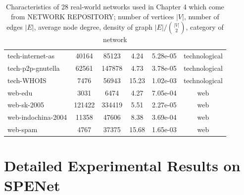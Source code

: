 \documentclass[senior,final,11pt]{iscs-thesis}
\begin{document}
\begin{table}[htb]
\begin{center}
{\begin{tabular}{l | c c c c c}
        tech-internet-as & 40164 & 85123 & 4.24 & 5.28e-05 & technological\\
        tech-p2p-gnutella & 62561 & 147878 & 4.73 & 3.78e-05 & technological\\
        tech-WHOIS & 7476 & 56943 & 15.23 & 1.02e-03 & technological\\
        web-edu & 3031 & 6474 & 4.27 & 7.05e-04 & web\\
        web-sk-2005 & 121422 & 334419 & 5.51 & 2.27e-05 & web\\
        web-indochina-2004 & 11358 & 47606 & 8.38 & 3.69e-04 & web\\
        web-spam & 4767 & 37375 & 15.68 & 1.65e-03 & web\\
      \end{tabular}
      }
      \caption{Characteristics of 28 real-world networks used in Chapter 4 which come from NETWORK REPOSITORY; number of vertices $|V|$, number of edges $|E|$, average node degree, density of graph $|E|/ \binom{|V|}{2}$, category of network}
      \label{tab:data_dos_pdos}
    \end{center}
  \end{table}

\chapter{Detailed Experimental Results on SPENet}
\end{document}
